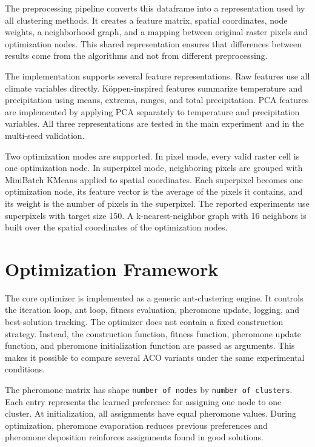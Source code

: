 \documentclass[11pt]{article}
\begin{document}
The preprocessing pipeline converts this dataframe into a representation used by all clustering methods. It creates a feature matrix, spatial coordinates, node weights, a neighborhood graph, and a mapping between original raster pixels and optimization nodes. This shared representation ensures that differences between results come from the algorithms and not from different preprocessing.

The implementation supports several feature representations. Raw features use all climate variables directly. Köppen-inspired features summarize temperature and precipitation using means, extrema, ranges, and total precipitation. PCA features are implemented by applying PCA separately to temperature and precipitation variables. All three representations are tested in the main experiment and in the multi-seed validation.

Two optimization modes are supported. In pixel mode, every valid raster cell is one optimization node. In superpixel mode, neighboring pixels are grouped with MiniBatch KMeans applied to spatial coordinates. Each superpixel becomes one optimization node, its feature vector is the average of the pixels it contains, and its weight is the number of pixels in the superpixel. The reported experiments use superpixels with target size 150. A k-nearest-neighbor graph with 16 neighbors is built over the spatial coordinates of the optimization nodes.

\section*{Optimization Framework}

The core optimizer is implemented as a generic ant-clustering engine. It controls the iteration loop, ant loop, fitness evaluation, pheromone update, logging, and best-solution tracking. The optimizer does not contain a fixed construction strategy. Instead, the construction function, fitness function, pheromone update function, and pheromone initialization function are passed as arguments. This makes it possible to compare several ACO variants under the same experimental conditions.

The pheromone matrix has shape \texttt{number of nodes} by \texttt{number of clusters}. Each entry represents the learned preference for assigning one node to one cluster. At initialization, all assignments have equal pheromone values. During optimization, pheromone evaporation reduces previous preferences and pheromone deposition reinforces assignments found in good solutions.
\end{document}
